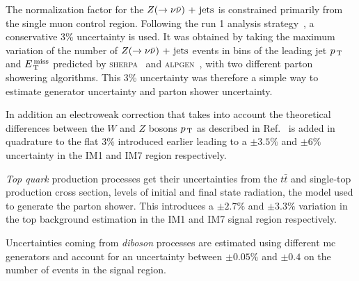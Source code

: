 The normalization factor for the $Z (\rightarrow \nu \bar{\nu})\mathrm{~+~jets}$ is constrained primarily from
the single muon control region. Following the run 1 analysis
strategy~\cite{RunIPaper}, a conservative 3\% uncertainty is used. It was
obtained by taking the maximum variation of the number of $Z (\rightarrow \nu \bar{\nu})\mathrm{~+~jets}$
events in bins of the leading jet $p_\mathrm{\, T}$ and $E_\mathrm{\, T}^\mathrm{\, miss}$ predicted by
\textsc{sherpa}~\cite{SHERPA} and \textsc{alpgen}~\cite{ALPGEN}, with two
different parton showering algorithms. This 3\% uncertainty was therefore a
simple way to estimate generator uncertainty and parton shower uncertainty.

In addition an electroweak correction that takes into account the theoretical
differences between the $W$ and $Z$ bosons $p_\mathrm{\, T}$ as described in
Ref.~\cite{EWCorrections} is added in quadrature to the flat 3\% introduced
earlier leading to a $\pm 3.5\%$ and $\pm 6\%$ uncertainty in the IM1 and IM7
region respectively.

\emph{Top quark} production processes get their uncertainties from the
$t \bar{t}$ and single-top production cross section, levels of initial and final
state radiation, the model used to generate the parton shower. This introduces a
$\pm 2.7\%$ and $\pm 3.3 \%$ variation in the top background estimation in the
IM1 and IM7 signal region respectively.

Uncertainties coming from \emph{diboson} processes are estimated using different
\gls{mc} generators and account for an uncertainty between $\pm 0.05\%$ and
$\pm 0.4$ on the number of events in the signal region.
